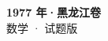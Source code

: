 \documentclass[zihao=-4, a4paper]{ctexart}
\begin{document}
\begin{center}
  {\Large\bfseries 1977 年·黑龙江卷}\\[4pt]
  {\large 数学 · 试题版}
\end{center}
\medskip
{}

\end{document}
